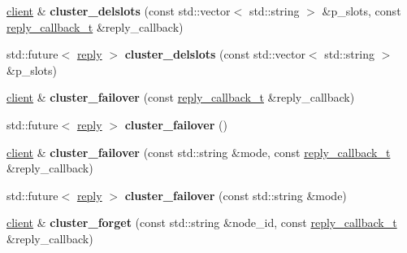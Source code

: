 \begin{DoxyCompactItemize}
\hyperlink{classcpp__redis_1_1client}{client} \& {\bfseries cluster\+\_\+delslots} (const std\+::vector$<$ std\+::string $>$ \&p\+\_\+slots, const \hyperlink{classcpp__redis_1_1client_a061a1140d36d2eaeda82b09a0bb3f9f2}{reply\+\_\+callback\+\_\+t} \&reply\+\_\+callback)
\item 
\mbox{\label{classcpp__redis_1_1client_a6cd07520f60ee78c4603211273adcf46}} 
std\+::future$<$ \hyperlink{classcpp__redis_1_1reply}{reply} $>$ {\bfseries cluster\+\_\+delslots} (const std\+::vector$<$ std\+::string $>$ \&p\+\_\+slots)
\item 
\mbox{\label{classcpp__redis_1_1client_a5afcee001e210150803a95c3d6412998}} 
\hyperlink{classcpp__redis_1_1client}{client} \& {\bfseries cluster\+\_\+failover} (const \hyperlink{classcpp__redis_1_1client_a061a1140d36d2eaeda82b09a0bb3f9f2}{reply\+\_\+callback\+\_\+t} \&reply\+\_\+callback)
\item 
\mbox{\label{classcpp__redis_1_1client_a76122bb138c12b90c78c4e511f45ef17}} 
std\+::future$<$ \hyperlink{classcpp__redis_1_1reply}{reply} $>$ {\bfseries cluster\+\_\+failover} ()
\item 
\mbox{\label{classcpp__redis_1_1client_a9c95de64e422c09c2180dc69db386d06}} 
\hyperlink{classcpp__redis_1_1client}{client} \& {\bfseries cluster\+\_\+failover} (const std\+::string \&mode, const \hyperlink{classcpp__redis_1_1client_a061a1140d36d2eaeda82b09a0bb3f9f2}{reply\+\_\+callback\+\_\+t} \&reply\+\_\+callback)
\item 
\mbox{\label{classcpp__redis_1_1client_a06f9c7d27f961787b01a01be95f1fa29}} 
std\+::future$<$ \hyperlink{classcpp__redis_1_1reply}{reply} $>$ {\bfseries cluster\+\_\+failover} (const std\+::string \&mode)
\item 
\mbox{\label{classcpp__redis_1_1client_aea8a77acb9031fd03f8ab5dc2c09a17d}} 
\hyperlink{classcpp__redis_1_1client}{client} \& {\bfseries cluster\+\_\+forget} (const std\+::string \&node\+\_\+id, const \hyperlink{classcpp__redis_1_1client_a061a1140d36d2eaeda82b09a0bb3f9f2}{reply\+\_\+callback\+\_\+t} \&reply\+\_\+callback)
\item 
\mbox{\label{classcpp__redis_1_1client_a58457400352dee764066bd9f737f667a}} 

\end{DoxyCompactItemize}
